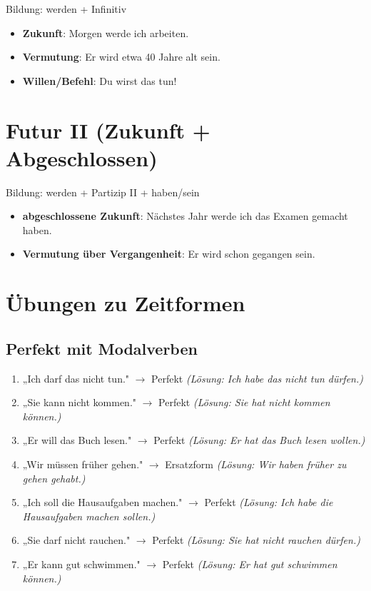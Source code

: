 Bildung: werden + Infinitiv

\begin{itemize}
    \item \textbf{Zukunft}: Morgen werde ich arbeiten.
    \item \textbf{Vermutung}: Er wird etwa 40 Jahre alt sein.
    \item \textbf{Willen/Befehl}: Du wirst das tun!
\end{itemize}

\section{Futur II (Zukunft + Abgeschlossen)}
\label{sec:FuturII}

Bildung: werden + Partizip II + haben/sein

\begin{itemize}
    \item \textbf{abgeschlossene Zukunft}: Nächstes Jahr werde ich das Examen gemacht haben.
    \item \textbf{Vermutung über Vergangenheit}: Er wird schon gegangen sein.
\end{itemize}

\section{Übungen zu Zeitformen}
\label{sec:ZeitformenUebungen}

\subsection{Perfekt mit Modalverben}
\begin{enumerate}
    \item „Ich darf das nicht tun." $\rightarrow$ Perfekt \quad \textit{(Lösung: Ich habe das nicht tun dürfen.)}
    \item „Sie kann nicht kommen." $\rightarrow$ Perfekt \quad \textit{(Lösung: Sie hat nicht kommen können.)}
    \item „Er will das Buch lesen." $\rightarrow$ Perfekt \quad \textit{(Lösung: Er hat das Buch lesen wollen.)}
    \item „Wir müssen früher gehen." $\rightarrow$ Ersatzform \quad \textit{(Lösung: Wir haben früher zu gehen gehabt.)}
    \item „Ich soll die Hausaufgaben machen." $\rightarrow$ Perfekt \quad \textit{(Lösung: Ich habe die Hausaufgaben machen sollen.)}
    \item „Sie darf nicht rauchen." $\rightarrow$ Perfekt \quad \textit{(Lösung: Sie hat nicht rauchen dürfen.)}
    \item „Er kann gut schwimmen." $\rightarrow$ Perfekt \quad \textit{(Lösung: Er hat gut schwimmen können.)}
\end{enumerate}

